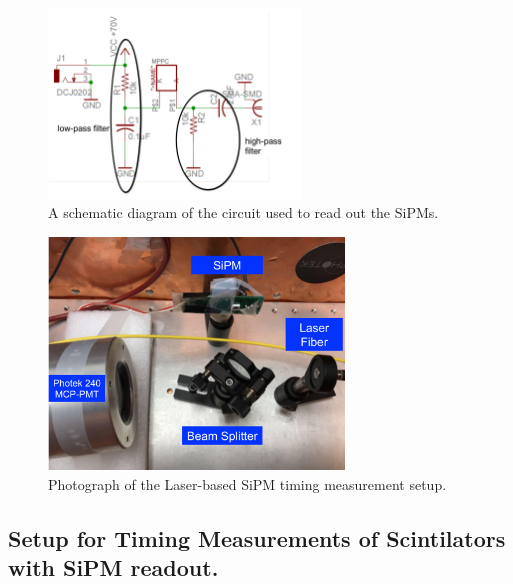 \begin{figure}[htbp]
\centering
\includegraphics[width=0.60\textwidth]{figures/CircuitDiagram.pdf}
\caption{A schematic diagram of the circuit used to read out the SiPMs.}
\label{fig:Circuit}
\end{figure}



\begin{figure}[htbp] 
\centering
\includegraphics[width=0.70\textwidth]{figures/SiPMSetup1.pdf} 
\caption{Photograph of the Laser-based SiPM timing measurement setup.} 
\label{fig:laserSetup} 
\end{figure} 

\subsection{Setup for Timing Measurements of Scintilators with SiPM readout.}

